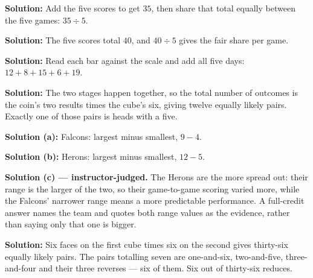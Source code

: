 \documentclass[12pt]{article}
\begin{document}




\textbf{Solution:} \quad Add the five scores to get $35$, then share that total equally
between the five games: $35 \div 5$. 


\textbf{Solution:} \quad The five scores total $40$, and $40 \div 5$ gives the fair share
per game. 


\textbf{Solution:} \quad Read each bar against the scale and add all five days:
$12 + 8 + 15 + 6 + 19$. 


\textbf{Solution:} \quad The two stages happen together, so the total number of outcomes is
the coin's two results times the cube's six, giving twelve equally likely pairs. Exactly one
of those pairs is heads with a five. 


\textbf{Solution (a):} \quad Falcons: largest minus smallest, $9 - 4$. 

\textbf{Solution (b):} \quad Herons: largest minus smallest, $12 - 5$. 

\textbf{Solution (c) --- instructor-judged.} \quad The Herons are the more spread out: their
range is the larger of the two, so their game-to-game scoring varied more, while the
Falcons' narrower range means a more predictable performance. A full-credit answer names the
team and quotes both range values as the evidence, rather than saying only that one is
bigger.


\textbf{Solution:} \quad Six faces on the first cube times six on the second gives
thirty-six equally likely pairs. The pairs totalling seven are one-and-six, two-and-five,
three-and-four and their three reverses --- six of them. Six out of thirty-six reduces.
\end{document}
